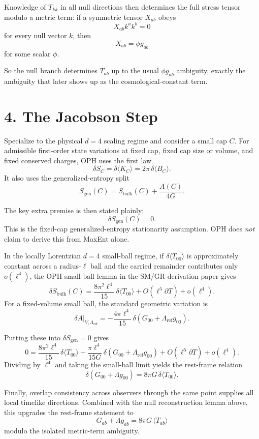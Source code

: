 \documentclass[10pt]{article}
\begin{document}
Knowledge of \(T_{kk}\) in all null directions then determines the full stress tensor modulo a metric term: if a symmetric tensor \(X_{ab}\) obeys
\[
X_{ab} k^a k^b = 0
\]
for every null vector \(k\), then
\[
X_{ab} = \phi g_{ab}
\]
for some scalar \(\phi\).

So the null branch determines \(T_{ab}\) up to the usual \(\phi g_{ab}\) ambiguity, exactly the ambiguity that later shows up as the cosmological-constant term.

\section*{4. The Jacobson Step}

Specialize to the physical \(d=4\) scaling regime and consider a small cap \(C\). For admissible first-order state variations at fixed cap, fixed cap size or volume, and fixed conserved charges, OPH uses the first law
\[
\delta S_C = \delta \langle K_C\rangle = 2\pi\,\delta\langle B_C\rangle.
\]
It also uses the generalized-entropy split
\[
S_{\mathrm{gen}}(C)=S_{\mathrm{bulk}}(C)+\frac{A(C)}{4G}.
\]

The key extra premise is then stated plainly:
\[
\delta S_{\mathrm{gen}}(C)=0.
\]
This is the fixed-cap generalized-entropy stationarity assumption. OPH does \emph{not} claim to derive this from MaxEnt alone.

In the locally Lorentzian \(d=4\) small-ball regime, if \(\delta\langle T_{00}\rangle\) is approximately constant across a radius-\(\ell\) ball and the carried remainder contributes only \(o(\ell^4)\), the OPH small-ball lemma in the SM/GR derivation paper gives
\[
\delta S_{\mathrm{bulk}}(C)
=
\frac{8\pi^2 \ell^4}{15}\,\delta\langle T_{00}\rangle
+ O(\ell^5 \partial T)+o(\ell^4).
\]
For a fixed-volume small ball, the standard geometric variation is
\[
\delta A\big|_{V,\Lambda_{\mathrm{ref}}}
=
-\frac{4\pi \ell^4}{15}\,
\delta\!\left(G_{00}+\Lambda_{\mathrm{ref}} g_{00}\right).
\]

Putting these into \(\delta S_{\mathrm{gen}}=0\) gives
\[
0
=
\frac{8\pi^2 \ell^4}{15}\,\delta\langle T_{00}\rangle
-\frac{\pi \ell^4}{15G}\,
\delta\!\left(G_{00}+\Lambda_{\mathrm{ref}} g_{00}\right)
+ O(\ell^5 \partial T)+o(\ell^4).
\]
Dividing by \(\ell^4\) and taking the small-ball limit yields the rest-frame relation
\[
\delta\!\left(G_{00}+\Lambda g_{00}\right)
=
8\pi G\,\delta\langle T_{00}\rangle.
\]

Finally, overlap consistency across observers through the same point supplies all local timelike directions. Combined with the null reconstruction lemma above, this upgrades the rest-frame statement to
\[
G_{ab}+\Lambda g_{ab}=8\pi G\,\langle T_{ab}\rangle
\]
modulo the isolated metric-term ambiguity.
\end{document}
